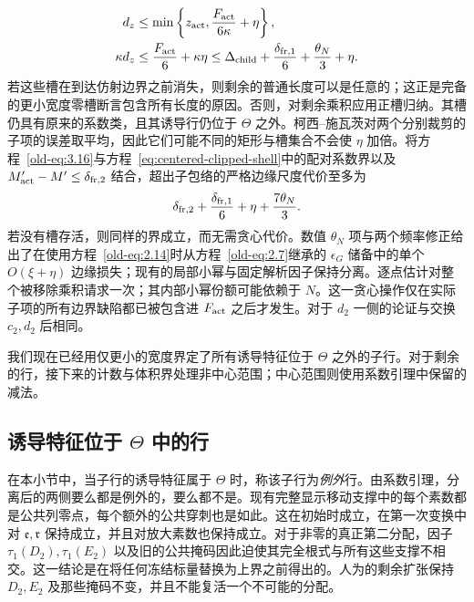 \documentclass[11pt,a4paper]{article}
\numberwithin{equation}{section}
\numberwithin{figure}{section}
\theoremstyle{definition}
\theoremstyle{remark}
\begin{document}
\begin{equation}
 \begin{split}
 d_z&\le\min\left\{z_{\rm act},
                     \frac{F_{\rm act}}{6\kappa}+\eta\right\},\\
 \kappa d_z&\le\frac{F_{\rm act}}6+\kappa\eta
 \le\Delta_{\rm child}+\frac{\delta_{{\rm fr},1}}6
                       +\frac{\theta_N}{3}+\eta.
 \end{split}
 \label{old-eq:3.16}
\end{equation}
若这些槽在到达仿射边界之前消失，则剩余的普通长度可以是任意的；这正是完备的更小宽度零槽断言包含所有长度的原因。否则，对剩余乘积应用正槽归纳。其槽仍具有原来的系数类，且其诱导行仍位于 \(\Theta\) 之外。柯西--施瓦茨对两个分别裁剪的子项的误差取平均，因此它们可能不同的矩形与槽集合不会使 \(\eta\) 加倍。将方程~\eqref{old-eq:3.16}与方程~\eqref{eq:centered-clipped-shell}中的配对系数界以及 \(M'_{\rm act}-M'\le\delta_{{\rm fr},2}\) 结合，超出子包络的严格边缘尺度代价至多为
\begin{equation}
 \delta_{{\rm fr},2}+\frac{\delta_{{\rm fr},1}}6
        +\eta+\frac{7\theta_N}{3}.
 \label{eq:centered-child-edge-cost}
\end{equation}
若没有槽存活，则同样的界成立，而无需贪心代价。数值 \(\theta_N\) 项与两个频率修正给出了在使用方程~\eqref{old-eq:2.14}时从方程~\eqref{old-eq:2.7}继承的 \(\epsilon_G\) 储备中的单个 \(O(\xi+\eta)\) 边缘损失；现有的局部小幂与固定解析因子保持分离。逐点估计对整个被移除乘积请求一次；其内部小幂份额可能依赖于 \(N\)。这一贪心操作仅在实际子项的所有边界缺陷都已被包含进 \(F_{\rm act}\) 之后才发生。对于 \(d_2\) 一侧的论证与交换 \(c_2,d_2\) 后相同。

我们现在已经用仅更小的宽度界定了所有诱导特征位于 \(\Theta\) 之外的子行。对于剩余的行，接下来的计数与体积界处理非中心范围；中心范围则使用系数引理中保留的减法。

\subsection{诱导特征位于 \texorpdfstring{\(\Theta\)}{Theta} 中的行}在本小节中，当子行的诱导特征属于 \(\Theta\) 时，称该子行为\emph{例外}行。由系数引理，分离后的两侧要么都是例外的，要么都不是。现有完整显示移动支撑中的每个素数都是公共列零点，每个额外的公共穿刺也是如此。这在初始时成立，在第一次变换中对 \(\mathfrak e,\mathfrak r\) 保持成立，并且对放大素数也保持成立。对于非零的真正第二分配，因子 \(\tau_1(D_2),\tau_1(E_2)\) 以及旧的公共掩码因此迫使其完全根式与所有这些支撑不相交。这一结论是在将任何冻结标量替换为上界之前得出的。人为的剩余扩张保持 \(D_2,E_2\) 及那些掩码不变，并且不能复活一个不可能的分配。
\end{document}
